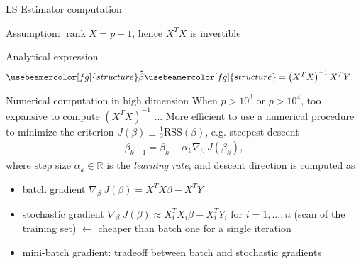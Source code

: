 \documentclass[compress, smaller, serif, 9pt]{beamer}
\newcommand{\structuretext}[1]{{\usebeamercolor[fg]{structure} #1}}
\DeclareMathOperator{\rank}{rank}
\begin{document}
\begin{frame}{LS Estimator computation}


Assumption: $\rank{X}=p+1$, hence $ X^T X $ is  invertible%

\begin{block}{Analytical expression}
\vspace{-5mm}
\begin{align*}
 \structuretext{\widehat{\beta} } &  \structuretext{=\left( X^T X \right)^{-1} X^T Y},
\end{align*}
\vspace{-5mm}
\end{block}

\begin{block}{Numerical computation in high dimension}
When $p>10^{3}$ or $p>10^{4}$, too expansive to compute  $\left( X^T X \right)^{-1}$ ... 
More efficient to use a numerical procedure to minimize the criterion $J(\beta) \equiv\frac{1}{2}\textrm{RSS}(\beta)$, e.g. steepest descent
\begin{align*}
 \beta_{k+1}= \beta_k - \alpha_k \nabla_{\beta} \ J(\beta_k),
\end{align*}
where  step size $\alpha_k \in \mathbb{R}$ is the {\em learning rate}, and descent direction is computed as 
 \begin{itemize}
   \item batch gradient $\nabla_{\beta} \ J(\beta)= X^T X \beta - X^T Y$
   \item stochastic gradient $\nabla_{\beta} \ J(\beta) \approx X_i^T X_i \beta - X_i^T Y_i$ 
   for $i=1,\ldots,n$ (scan of the training set) $\leftarrow$ cheaper than batch one for a single iteration
   \item mini-batch gradient: tradeoff between batch and stochastic gradients
  \end{itemize}
\end{block}
\end{frame}
\end{document}
